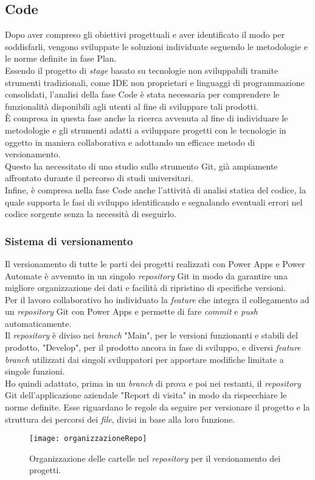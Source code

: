 \subsection{Code}
Dopo aver compreso gli obiettivi progettuali e aver identificato il modo per soddisfarli, vengono sviluppate le soluzioni individuate seguendo le metodologie e le norme definite in fase Plan.\\
Essendo il progetto di \emph{stage} basato su tecnologie non sviluppabili tramite strumenti tradizionali, come IDE non proprietari e linguaggi di programmazione consolidati, l'analisi della fase Code è stata necessaria per comprendere le funzionalità disponibili agli utenti al fine di sviluppare tali prodotti.\\
È compresa in questa fase anche la ricerca avvenuta al fine di individuare le metodologie e gli strumenti adatti a sviluppare progetti con le tecnologie in oggetto in maniera collaborativa e adottando un efficace metodo di versionamento.\\
Questo ha necessitato di uno studio sullo strumento Git, già ampiamente affrontato durante il percorso di studi universitari.\\
Infine, è compresa nella fase Code anche l'attività di analisi statica del codice, la quale supporta le fasi di sviluppo identificando e segnalando eventuali errori nel codice sorgente senza la necessità di eseguirlo.

\subsubsection*{Sistema di versionamento}
Il versionamento di tutte le parti dei progetti realizzati con Power Apps e Power Automate è avvenuto in un singolo \emph{repository} Git in modo da garantire una migliore organizzazione dei dati e facilità di ripristino di specifiche versioni.\\
Per il lavoro collaborativo ho individuato la \emph{feature} che integra il collegamento ad un \emph{repository} Git con Power Apps e permette di fare \emph{commit} e \emph{push} automaticamente.\\
Il \emph{repository} è diviso nei \emph{branch} "Main", per le versioni funzionanti e stabili del prodotto, "Develop", per il prodotto ancora in fase di sviluppo, e diversi \emph{feature branch} utilizzati dai singoli sviluppatori per apportare modifiche limitate a singole funzioni.\\
Ho quindi adattato, prima in un \emph{branch} di prova e poi nei restanti, il \emph{repository} Git dell'applicazione aziendale "Report di visita" in modo da rispecchiare le norme definite.
Esse riguardano le regole da seguire per versionare il progetto e la struttura dei percorsi dei \emph{file}, divisi in base alla loro funzione.
\begin{figure}[htbp] 
    \centering 
    \texttt{[image: organizzazioneRepo]} 
    \caption{Organizzazione delle cartelle nel \emph{repository} per il versionamento dei progetti.}
    \label{fig:organizzazioneRepo}
\end{figure}

